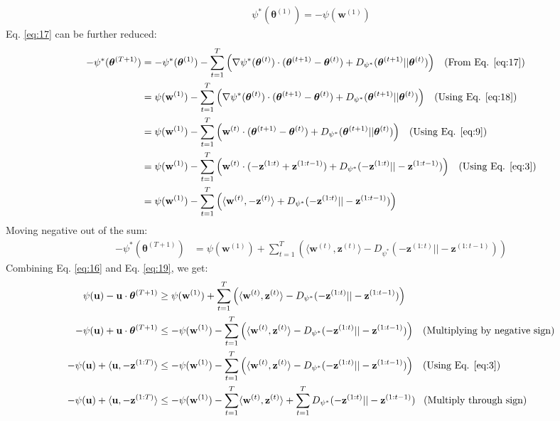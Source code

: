 \documentclass[11pt]{article}
\begin{document}
{\begin{align}
\label{eq:18}
  \psi^{*}(\bm\theta^{(1)})  = -\psi(\textbf{w}^{(1)})
\end{align}
Eq. \ref{eq:17} can be further reduced:
\begin{align*}
-\psi^{*}(\bm\theta^{(T+1)}) &= - \psi^{*}(\bm\theta^{(1)}) - \sum_{t=1}^{T}\left(\nabla \psi^{*}(\bm\theta^{(t)})\cdot(\bm\theta^{(t+1)}-\bm\theta^{(t)}) + D_{\psi^{*}}(\bm\theta^{(t+1)}||\bm\theta^{(t)}) \right) \;\;\; (\text{From Eq. \ref{eq:17}})\\
&= \psi(\textbf{w}^{(1)}) - \sum_{t=1}^{T}\left(\nabla \psi^{*}(\bm\theta^{(t)})\cdot(\bm\theta^{(t+1)}-\bm\theta^{(t)}) + D_{\psi^{*}}(\bm\theta^{(t+1)}||\bm\theta^{(t)}) \right) \;\;\; (\text{Using Eq. \ref{eq:18}})\\
&= \psi(\textbf{w}^{(1)}) - \sum_{t=1}^{T}\left(\textbf{w}^{(t)}\cdot(\bm\theta^{(t+1)}-\bm\theta^{(t)}) + D_{\psi^{*}}(\bm\theta^{(t+1)}||\bm\theta^{(t)}) \right) \;\;\; (\text{Using Eq. \ref{eq:9}})\\
&= \psi(\textbf{w}^{(1)}) - \sum_{t=1}^{T}\left(\textbf{w}^{(t)}\cdot(-\textbf{z}^{(1:t)}+\textbf{z}^{(1:t-1)}) + D_{\psi^{*}}(-\textbf{z}^{(1:t)}||-\textbf{z}^{(1:t-1)}) \right) \;\;\; (\text{Using Eq. \ref{eq:3}})\\
&= \psi(\textbf{w}^{(1)}) - \sum_{t=1}^{T}\left(\langle \textbf{w}^{(t)}, -\textbf{z}^{(t)} \rangle + D_{\psi^{*}}(-\textbf{z}^{(1:t)}||-\textbf{z}^{(1:t-1)}) \right)
\end{align*}
Moving negative out of the sum:
\begin{align}
\label{eq:19}
-\psi^{*}(\bm\theta^{(T+1)}) &= \psi(\textbf{w}^{(1)}) + \sum_{t=1}^{T}\left(\langle \textbf{w}^{(t)}, \textbf{z}^{(t)} \rangle - D_{\psi^{*}}(-\textbf{z}^{(1:t)}||-\textbf{z}^{(1:t-1)}) \right)
\end{align}
Combining Eq. \ref{eq:16} and Eq. \ref{eq:19}, we get:
\begin{align*}
\psi(\textbf{u}) - \textbf{u} \cdot \bm\theta^{(T+1)} &\geq \psi(\textbf{w}^{(1)}) + \sum_{t=1}^{T}\left(\langle \textbf{w}^{(t)}, \textbf{z}^{(t)} \rangle - D_{\psi^{*}}(-\textbf{z}^{(1:t)}||-\textbf{z}^{(1:t-1)}) \right)\\
-\psi(\textbf{u}) + \textbf{u} \cdot \bm\theta^{(T+1)} &\leq -\psi(\textbf{w}^{(1)}) - \sum_{t=1}^{T}\left(\langle \textbf{w}^{(t)}, \textbf{z}^{(t)} \rangle - D_{\psi^{*}}(-\textbf{z}^{(1:t)}||-\textbf{z}^{(1:t-1)}) \right) \;\;\; (\text{Multiplying by negative sign})\\
-\psi(\textbf{u}) + \langle \textbf{u}, -\textbf{z}^{(1:T)} \rangle &\leq -\psi(\textbf{w}^{(1)}) - \sum_{t=1}^{T}\left(\langle \textbf{w}^{(t)}, \textbf{z}^{(t)} \rangle - D_{\psi^{*}}(-\textbf{z}^{(1:t)}||-\textbf{z}^{(1:t-1)}) \right) \;\;\; (\text{Using Eq. \ref{eq:3}})\\
-\psi(\textbf{u}) + \langle \textbf{u}, -\textbf{z}^{(1:T)} \rangle &\leq -\psi(\textbf{w}^{(1)}) - \sum_{t=1}^{T}\langle \textbf{w}^{(t)}, \textbf{z}^{(t)} \rangle +\sum_{t=1}^{T} D_{\psi^{*}}(-\textbf{z}^{(1:t)}||-\textbf{z}^{(1:t-1)}) \;\;\; (\text{Multiply through sign})
\end{align*}


}
\end{document}
